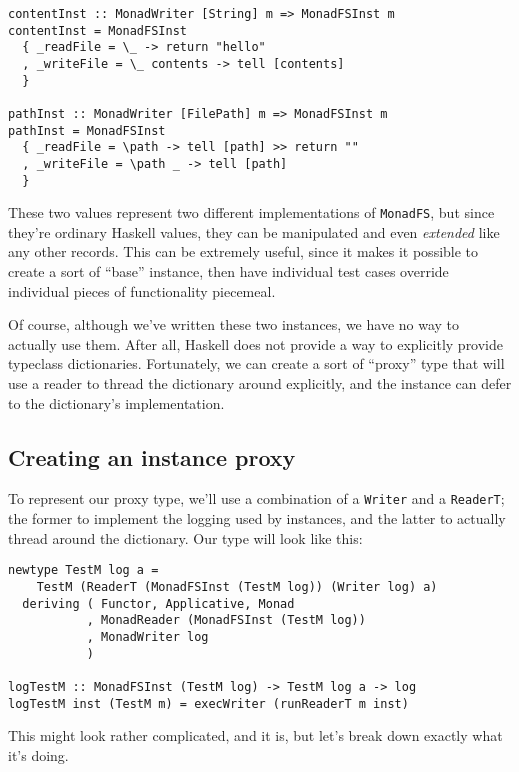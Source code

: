 \begin{verbatim}
contentInst :: MonadWriter [String] m => MonadFSInst m
contentInst = MonadFSInst
  { _readFile = \_ -> return "hello"
  , _writeFile = \_ contents -> tell [contents]
  }

pathInst :: MonadWriter [FilePath] m => MonadFSInst m
pathInst = MonadFSInst
  { _readFile = \path -> tell [path] >> return ""
  , _writeFile = \path _ -> tell [path]
  }
\end{verbatim}
These two values represent two different implementations of
\texttt{MonadFS}, but since they're ordinary Haskell values, they can be
manipulated and even \emph{extended} like any other records. This can be
extremely useful, since it makes it possible to create a sort of
``base'' instance, then have individual test cases override individual
pieces of functionality piecemeal.

Of course, although we've written these two instances, we have no way to
actually use them. After all, Haskell does not provide a way to
explicitly provide typeclass dictionaries. Fortunately, we can create a
sort of ``proxy'' type that will use a reader to thread the dictionary
around explicitly, and the instance can defer to the dictionary's
implementation.

\subsection{Creating an instance
proxy}
\label{creating-an-instance-proxy}

To represent our proxy type, we'll use a combination of a
\texttt{Writer} and a \texttt{ReaderT}; the former to implement the
logging used by instances, and the latter to actually thread around the
dictionary. Our type will look like this:

\begin{verbatim}
newtype TestM log a =
    TestM (ReaderT (MonadFSInst (TestM log)) (Writer log) a)
  deriving ( Functor, Applicative, Monad
           , MonadReader (MonadFSInst (TestM log))
           , MonadWriter log
           )

logTestM :: MonadFSInst (TestM log) -> TestM log a -> log
logTestM inst (TestM m) = execWriter (runReaderT m inst)
\end{verbatim}
This might look rather complicated, and it is, but let's break down
exactly what it's doing.

